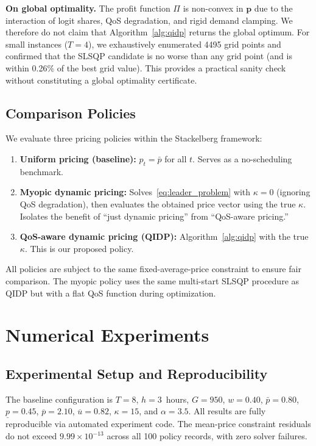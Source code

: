 \documentclass[11pt]{article}
\newcommand{\pcap}{\bar p}
\begin{document}
\textbf{On global optimality.} The profit function $\Pi$ is non-convex in
$\boldsymbol{p}$ due to the interaction of logit shares, QoS degradation,
and rigid demand clamping. We therefore do not claim that Algorithm~\ref{alg:qidp}
returns the global optimum. For small instances ($T=4$), we exhaustively
enumerated 4495 grid points and confirmed that the SLSQP candidate is no
worse than any grid point (and is within 0.26\% of the best grid value).
This provides a practical sanity check without constituting a global
optimality certificate.

\subsection{Comparison Policies}

We evaluate three pricing policies within the Stackelberg framework:

\begin{enumerate}[leftmargin=2em]
  \item \textbf{Uniform pricing (baseline):} $p_t=\pcap$ for all $t$.
  Serves as a no-scheduling benchmark.
  \item \textbf{Myopic dynamic pricing:} Solves~\eqref{eq:leader_problem}
  with $\kappa=0$ (ignoring QoS degradation), then evaluates the obtained
  price vector using the true $\kappa$. Isolates the benefit of ``just
  dynamic pricing'' from ``QoS-aware pricing.''
  \item \textbf{QoS-aware dynamic pricing (QIDP):} Algorithm~\ref{alg:qidp}
  with the true $\kappa$. This is our proposed policy.
\end{enumerate}

All policies are subject to the same fixed-average-price constraint to
ensure fair comparison. The myopic policy uses the same multi-start SLSQP
procedure as QIDP but with a flat QoS function during optimization.

\section{Numerical Experiments}
\label{sec:experiments}

\subsection{Experimental Setup and Reproducibility}

The baseline configuration is $T=8$, $h=3$~hours, $G=950$, $w=0.40$,
$\pcap=0.80$, $\underline p=0.45$, $\overline p=2.10$,
$\overline u=0.82$, $\kappa=15$, and $\alpha=3.5$. All results are
fully reproducible via automated experiment code. The mean-price constraint
residuals do not exceed $9.99\times10^{-13}$ across all 100 policy records,
with zero solver failures.
\end{document}
